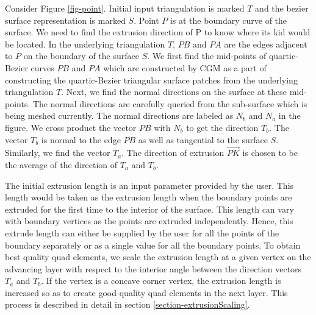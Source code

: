 Consider Figure \ref{fig-point}. Initial input triangulation is marked $T$ and the bezier surface representation is marked $S$. Point $P$ is at the boundary curve of the surface. We need to find the extrusion direction of P to know where its kid would be located. In the underlying triangulation $T$, $PB$ and $PA$ are the edges adjacent to $P$ on the boundary of the surface $S$. We first find the mid-points of quartic-Bezier curves $PB$ and $PA$ which are constructed by CGM as a part of constructing the quartic-Bezier triangular surface patches from the underlying triangulation $T$. Next, we find the normal directions on the surface at these mid-points. The normal directions are carefully queried from the sub-surface which is being meshed currently. The normal directions are labeled as $N_b$ and $N_a$ in the figure. We cross product the vector $PB$ with $N_b$ to get the direction $T_b$. The vector $T_b$ is normal to the edge $PB$ as well as tangential to the surface $S$. Similarly, we find the vector $T_a$. The direction of extrusion $\vec{PK}$ is chosen to be the average of the direction of $T_a$ and $T_b$.

The initial extrusion length is an input parameter provided by the user. This length would be taken as the extrusion length when the boundary points are extruded for the first time to the interior of the surface. This length can vary with boundary vertices as the points are extruded independently. Hence, this extrude length can either be supplied by the user for all the points of the boundary separately or as a single value for all the boundary points. To obtain best quality quad elements, we scale the extrusion length at a given vertex on the advancing layer with respect to the interior angle between the direction vectors $T_a$ and $T_b$. If the vertex is a concave corner vertex, the extrusion length is increased so as to create good quality quad elements in the next layer. This process is described in detail in section \ref{section-extrusionScaling}.%

